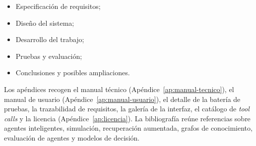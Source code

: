 \begin{itemize}
\item Especificación de requisitos;
\item Diseño del sistema;
\item Desarrollo del trabajo;
\item Pruebas y evaluación;
\item Conclusiones y posibles ampliaciones.
\end{itemize}

Los apéndices recogen el manual técnico (Apéndice~\ref{ap:manual-tecnico}), el
manual de usuario (Apéndice~\ref{ap:manual-usuario}), el detalle de la batería
de pruebas, la trazabilidad de requisitos, la galería de la interfaz, el catálogo
de \textit{tool calls} y la licencia (Apéndice~\ref{ap:licencia}). La
bibliografía reúne referencias sobre agentes inteligentes, simulación,
recuperación aumentada, grafos de conocimiento, evaluación de agentes y modelos
de decisión.

